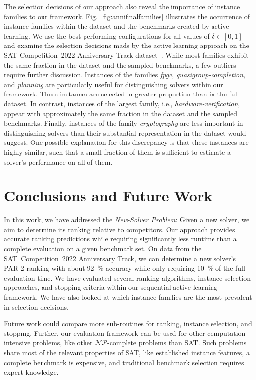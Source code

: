 \documentclass[sn-basic, Numbered]{sn-jnl} %
\begin{document}
The selection decisions of our approach also reveal the importance of instance families to our framework.
Fig.~\ref{fig:annifinalfamilies} illustrates the occurrence of instance families within the dataset and the benchmarks created by active learning.
We use the best performing configurations for all values of $\delta \in \left[0, 1\right]$ and examine the selection decisions made by the active learning approach on the SAT Competition~2022 Anniversary Track dataset~\cite{sat2022}.
While most families exhibit the same fraction in the dataset and the sampled benchmarks, a few outliers require further discussion.
Instances of the families \emph{fpga}, \emph{quasigroup-completion}, and \emph{planning} are particularly useful for distinguishing solvers within our framework.
These instances are selected in greater proportion than in the full dataset.
In contrast, instances of the largest family, i.e., \emph{hardware-verification}, appear with approximately the same fraction in the dataset and the sampled benchmarks.
Finally, instances of the family \emph{cryptography} are less important in distinguishing solvers than their substantial representation in the dataset would suggest.
One possible explanation for this discrepancy is that these instances are highly similar, such that a small fraction of them is sufficient to estimate a solver's performance on all of them.

\section{Conclusions and Future Work}
\label{sec:conclusion}

In this work, we have addressed the \emph{New-Solver Problem}:
Given a new solver, we aim to determine its ranking relative to competitors.
Our approach provides accurate ranking predictions while requiring significantly less runtime than a complete evaluation on a given benchmark set.
On data from the SAT~Competition~2022 Anniversary Track, we can determine a new solver's PAR-2 ranking with about \SI{92}{\%} accuracy while only requiring \SI{10}{\%} of the full-evaluation time.
We have evaluated several ranking algorithms, instance-selection approaches, and stopping criteria within our sequential active learning framework.
We have also looked at which instance families are the most prevalent in selection decisions.

Future work could compare more sub-routines for ranking, instance selection, and stopping.
Further, our evaluation framework can be used for other computation-intensive problems, like other $\mathcal{NP}$-complete problems than SAT.
Such problems share most of the relevant properties of SAT, like established instance features, a complete benchmark is expensive, and traditional benchmark selection requires expert knowledge.
\end{document}
